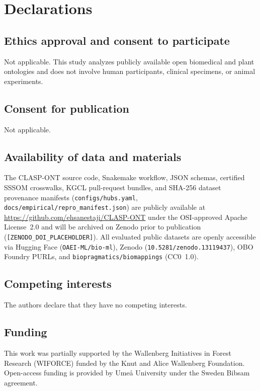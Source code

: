 \documentclass[10pt]{article}
\theoremstyle{accentdef}
\begin{document}
\section*{Declarations}

\subsection*{Ethics approval and consent to participate}
Not applicable. This study analyzes publicly available open biomedical and plant ontologies and does not involve human participants, clinical specimens, or animal experiments.

\subsection*{Consent for publication}
Not applicable.

\subsection*{Availability of data and materials}
The \textsc{CLASP-ONT} source code, Snakemake workflow, JSON schemas, certified SSSOM crosswalks, KGCL pull-request bundles, and SHA-256 dataset provenance manifests (\texttt{configs/hubs.yaml}, \texttt{docs/empirical/\allowbreak repro\_manifest.json}) are publicly available at \url{https://github.com/ehsanestaji/CLASP-ONT} under the OSI-approved Apache License~2.0 and will be archived on Zenodo prior to publication (\texttt{[ZENODO\_DOI\_PLACEHOLDER]}). All evaluated public datasets are openly accessible via Hugging Face (\texttt{OAEI-ML/\allowbreak bio-ml}), Zenodo (\texttt{10.5281/\allowbreak zenodo.13119437}), OBO Foundry PURLs, and \texttt{biopragmatics/\allowbreak biomappings} (CC0~1.0).

\subsection*{Competing interests}
The authors declare that they have no competing interests.

\subsection*{Funding}
This work was partially supported by the Wallenberg Initiatives in Forest Research (WIFORCE) funded by the Knut and Alice Wallenberg Foundation. Open-access funding is provided by Ume{\aa} University under the Sweden Bibsam agreement.
\end{document}
